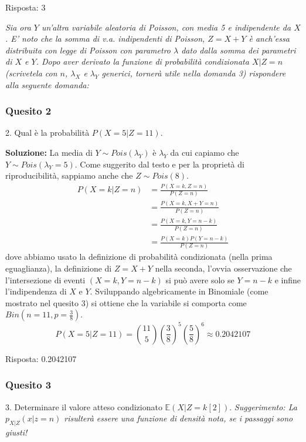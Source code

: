 \documentclass[12pt, a4paper]{article}
\begin{document}
Risposta: 3

\vspace{0.3cm}
\textit{Sia ora $Y$ un’altra variabile aleatoria di Poisson, con media 5 e indipendente da $X$. E’ noto che la somma di v.a. indipendenti di Poisson, $Z=X+Y$ è anch’essa distribuita con legge di Poisson con parametro $\lambda$ dato dalla somma dei parametri di $X$ e $Y$.
Dopo aver derivato la funzione di probabilità condizionata $X|Z=n$ (scrivetela con $n$, $\lambda_X$ e $\lambda_Y$ generici, tornerà utile nella domanda 3) rispondere alla seguente domanda:}

\subsubsection*{Quesito 2}
2. Qual è la probabilità $P(X=5|Z=11)$.

\textbf{Soluzione:}
La media di $Y \sim Pois(\lambda_Y)$ è $\lambda_Y$ da cui capiamo che $Y \sim Pois(\lambda_Y=5)$.
Come suggerito dal testo e per la proprietà di riproducibilità, sappiamo anche che $Z \sim Pois(8)$.
$$ \begin{aligned} P(X=k|Z=n) &= \frac{P(X=k, Z=n)}{P(Z=n)} \\ &= \frac{P(X=k, X+Y=n)}{P(Z=n)} \\ &= \frac{P(X=k, Y=n-k)}{P(Z=n)} \\ &= \frac{P(X=k)P(Y=n-k)}{P(Z=n)} \end{aligned} $$
dove abbiamo usato la definizione di probabilità condizionata (nella prima eguaglianza), la definizione di $Z=X+Y$ nella seconda, l’ovvia osservazione che l’intersezione di eventi $(X=k, Y=n-k)$ si può avere solo se $Y=n-k$ e infine l’indipendenza di $X$ e $Y$.
Sviluppando algebricamente in Binomiale (come mostrato nel quesito 3) si ottiene che la variabile si comporta come $Bin(n=11, p=\frac{3}{8})$.
$$ P(X=5|Z=11) = \binom{11}{5} \left(\frac{3}{8}\right)^5 \left(\frac{5}{8}\right)^6 \approx 0.2042107 $$

Risposta: 0.2042107

\subsubsection*{Quesito 3}
3. Determinare il valore atteso condizionato $\mathbb{E}(X|Z=k[2])$.
\textit{Suggerimento: La $p_{X|Z}(x|z=n)$ risulterà essere una funzione di densità nota, se i passaggi sono giusti!}
\end{document}
